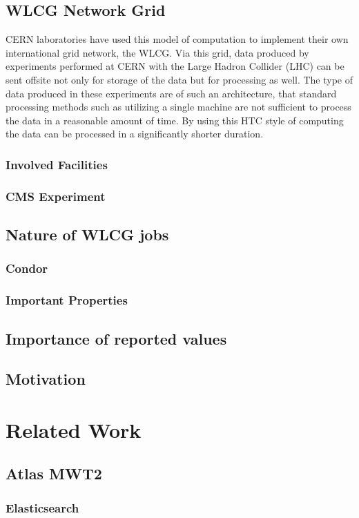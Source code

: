 \documentclass[]{scrartcl}
\begin{document}
\subsection{WLCG Network Grid}
CERN laboratories have used this model of computation to implement their own international grid network, the WLCG. Via this grid, data produced by experiments performed at CERN with the Large Hadron Collider (LHC) can be sent offsite not only for storage of the data but for processing as well. The type of data produced in these experiments are of such an architecture, that standard processing methods such as utilizing a single machine are not sufficient to process the data in a reasonable amount of time. By using this HTC style of computing the data can be processed in a significantly shorter duration.
\subsubsection{Involved Facilities}
\subsubsection{CMS Experiment}
\subsection{Nature of WLCG jobs}
\subsubsection{Condor}
\subsubsection{Important Properties}
\subsection{Importance of reported values}
\subsection{Motivation}

\section{Related Work}
\subsection{Atlas MWT2}
\subsubsection{Elasticsearch}
\end{document}
